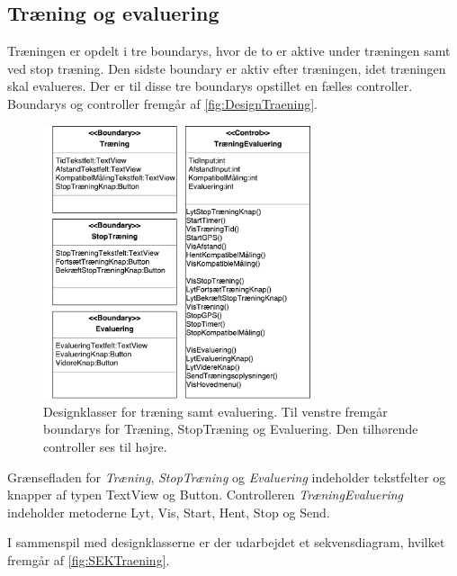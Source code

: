 \subsection*{Træning og evaluering}
Træningen er opdelt i tre boundarys, hvor de to er aktive under træningen samt ved stop træning. Den sidste boundary er aktiv efter træningen, idet træningen skal evalueres. Der er til disse tre boundarys opstillet en fælles controller. Boundarys og controller fremgår af \autoref{fig:DesignTraening}. 

\begin{figure} [H]
\centering
\includegraphics[width=0.7\textwidth]{figures/MVC/MVCTraening}
\caption{Designklasser for træning samt evaluering. Til venstre fremgår boundarys for Træning, StopTræning og Evaluering. Den tilhørende controller ses til højre.}
\label{fig:DesignTraening}
\end{figure}

\noindent
Grænsefladen for \textit{Træning}, \textit{StopTræning} og \textit{Evaluering} indeholder tekstfelter og knapper af typen TextView og Button. Controlleren \textit{TræningEvaluering} indeholder metoderne Lyt, Vis, Start, Hent, Stop og Send. 

I sammenspil med designklasserne er der udarbejdet et sekvensdiagram, hvilket fremgår af \autoref{fig:SEKTraening}. 

